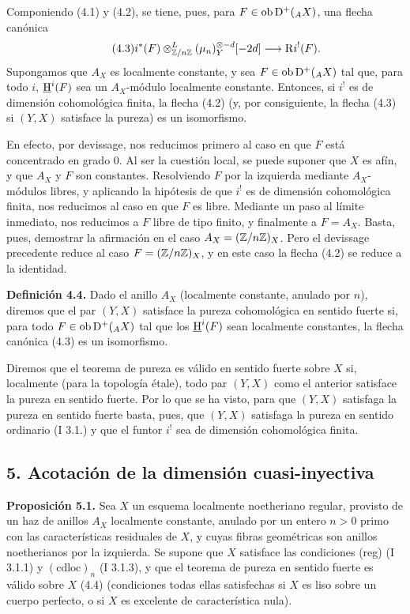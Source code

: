 Componiendo (4.1) y (4.2), se tiene, pues, para $F\in\operatorname{ob}\mathrm{D}^+({}_A X)$, una flecha canónica
\begin{equation}\tag{4.3}
        i^*(F)\otimes^L_{\mathbb{Z}/n\mathbb{Z}}(\mu_n)_Y^{\otimes -d}[-2d]\longrightarrow \mathrm{R} i^!(F).
\end{equation}
Supongamos que $A_X$ es localmente constante, y sea $F\in\operatorname{ob}\mathrm{D}^+({}_A X)$ tal que, para todo $i$, $\underline{\mathrm H}^i(F)$ sea un $A_X$-módulo localmente constante. Entonces, si $i^!$ es de dimensión cohomológica finita, la flecha (4.2) (y, por consiguiente, la flecha (4.3) si $(Y,X)$ satisface la pureza) es un isomorfismo.

En efecto, por devissage, nos reducimos primero al caso en que $F$ está concentrado en grado $0$. Al ser la cuestión local, se puede suponer que $X$ es afín, y que $A_X$ y $F$ son constantes. Resolviendo $F$ por la izquierda mediante $A_X$-módulos libres, y aplicando la hipótesis de que $i^!$ es de dimensión cohomológica finita, nos reducimos al caso en que $F$ es libre. Mediante un paso al límite inmediato, nos reducimos a $F$ libre de tipo finito, y finalmente a $F=A_X$. Basta, pues, demostrar la afirmación en el caso $A_X=(\mathbb{Z}/n\mathbb{Z})_X$. Pero el devissage precedente reduce al caso $F=(\mathbb{Z}/n\mathbb{Z})_X$, y en este caso la flecha (4.2) se reduce a la identidad.

\textbf{Definición 4.4.} Dado el anillo $A_X$ (localmente constante, anulado por $n$), diremos que el par $(Y,X)$ satisface la pureza cohomológica en sentido fuerte si, para todo $F\in\operatorname{ob}\mathrm{D}^+({}_A X)$ tal que los $\underline{\mathrm H}^i(F)$ sean localmente constantes, la flecha canónica (4.3) es un isomorfismo.

Diremos que el teorema de pureza es válido en sentido fuerte sobre $X$ si, localmente (para la topología étale), todo par $(Y,X)$ como el anterior satisface la pureza en sentido fuerte. Por lo que se ha visto, para que $(Y,X)$ satisfaga la pureza en sentido fuerte basta, pues, que $(Y,X)$ satisfaga la pureza en sentido ordinario (I 3.1.) y que el funtor $i^!$ sea de dimensión cohomológica finita.

\subsection*{5. Acotación de la dimensión cuasi-inyectiva}

\textbf{Proposición 5.1.} Sea $X$ un esquema localmente noetheriano regular, provisto de un haz de anillos $A_X$ localmente constante, anulado por un entero $n>0$ primo con las características residuales de $X$, y cuyas fibras geométricas son anillos noetherianos por la izquierda. Se supone que $X$ satisface las condiciones (reg) (I 3.1.1) y $(\mathrm{cdloc})_n$ (I 3.1.3), y que el teorema de pureza en sentido fuerte es válido sobre $X$ (4.4) (condiciones todas ellas satisfechas si $X$ es liso sobre un cuerpo perfecto, o si $X$ es excelente de característica nula).

